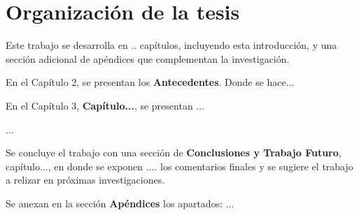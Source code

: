 \section {Organización de la tesis}

Este trabajo se desarrolla en .. capítulos, incluyendo esta introducción, y una sección adicional de apéndices que complementan la investigación.%

En el Capítulo 2, se presentan los \textbf{Antecedentes}. Donde se hace...%

En el Capítulo 3, \textbf{Capítulo...}, se presentan ...%

...

Se concluye el trabajo con una sección de \textbf{Conclusiones y Trabajo Futuro}, capítulo..., en donde se exponen .... los comentarios finales y se sugiere el trabajo a relizar en próximas investigaciones.%

Se anexan en la sección \textbf{Apéndices} los apartados: ...
